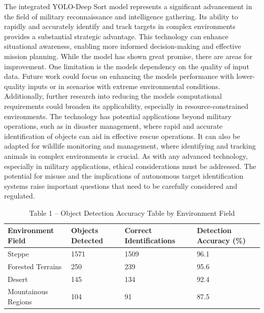 \begin{multicols}{2}
The integrated YOLO-Deep Sort model represents a significant advancement
in the field of military reconnaissance and intelligence gathering. Its
ability to rapidly and accurately identify and track targets in complex
environments provides a substantial strategic advantage. This technology
can enhance situational awareness, enabling more informed
decision-making and effective mission planning. While the model has
shown great promise, there are areas for improvement. One limitation is
the model\textquotesingle s dependency on the quality of input data.
Future work could focus on enhancing the model\textquotesingle s
performance with lower-quality inputs or in scenarios with extreme
environmental conditions. Additionally, further research into reducing
the model\textquotesingle s computational requirements could broaden its
applicability, especially in resource-constrained environments. The
technology has potential applications beyond military operations, such
as in disaster management, where rapid and accurate identification of
objects can aid in effective rescue operations. It can also be adapted
for wildlife monitoring and management, where identifying and tracking
animals in complex environments is crucial. As with any advanced
technology, especially in military applications, ethical considerations
must be addressed. The potential for misuse and the implications of
autonomous target identification systems raise important questions that
need to be carefully considered and regulated.
\end{multicols}

\begin{table}[H]
\caption{Table 1 -- Object Detection Accuracy Table by Environment Field}
\centering
\begin{tabular}{|l|l|l|l|}
\hline
Environment Field & Objects Detected & Correct Identifications & Detection Accuracy (\%) \\ \hline
Steppe & 1571 & 1509 & 96.1 \\ \hline
Forested Terrains & 250 & 239 & 95.6 \\ \hline
Desert & 145 & 134 & 92.4 \\ \hline
Mountainous Regions & 104 & 91 & 87.5 \\ \hline
\end{tabular}
\end{table}

